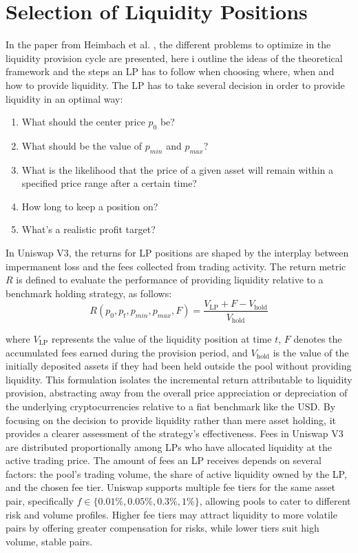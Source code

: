 \documentclass{article}
\begin{document}
\section{Selection of Liquidity Positions}

In the paper from Heimbach et al. \cite{heimbach2022}, the different problems to optimize in the liquidity provision cycle are presented, here i outline the ideas of the theoretical framework and the steps an LP has to follow when choosing where, when and how to provide liquidity. \newline
The LP has to take several decision in order to provide liquidity in an optimal way:
\begin{enumerate}
    \item What should the center price $p_0$ be?
    \item What should be the value of $p_{min}$ and $p_{max}$?
    \item What is the likelihood that the price of a given asset will remain within a specified price range after a certain time?
    \item How long to keep a position on?

    \item What’s a realistic profit target?
\end{enumerate}
In Uniswap V3, the returns for LP positions are shaped by the interplay between impermanent loss and the fees collected from trading activity. The return metric $ R $ is defined to evaluate the performance of providing liquidity relative to a benchmark holding strategy, as follows:
\begin{equation}
    R(p_0, p_t, p_{min}, p_{max}, F) = \frac{V_{\text{LP}} + F - V_{\text{hold}}}{V_{\text{hold}}}
\end{equation}

where $ V_{\text{LP}} $ represents the value of the liquidity position at time $ t $, $ F $ denotes the accumulated fees earned during the provision period, and $ V_{\text{hold}} $ is the value of the initially deposited assets if they had been held outside the pool without providing liquidity. This formulation isolates the incremental return attributable to liquidity provision, abstracting away from the overall price appreciation or depreciation of the underlying cryptocurrencies relative to a fiat benchmark like the USD. By focusing on the decision to provide liquidity rather than mere asset holding, it provides a clearer assessment of the strategy's effectiveness.\newline
Fees in Uniswap V3 are distributed proportionally among LPs who have allocated liquidity at the active trading price. The amount of fees an LP receives depends on several factors: the pool's trading volume, the share of active liquidity owned by the LP, and the chosen fee tier. Uniswap supports multiple fee tiers for the same asset pair, specifically $ f \in \{0.01\%, 0.05\%, 0.3\%, 1\%\} $, allowing pools to cater to different risk and volume profiles. Higher fee tiers may attract liquidity to more volatile pairs by offering greater compensation for risks, while lower tiers suit high volume, stable pairs.
\end{document}

